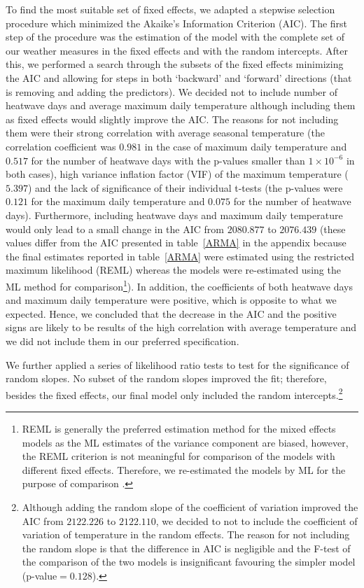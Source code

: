 \documentclass[12pt]{iopart}
\begin{document}
To find the most suitable set of fixed effects, we adapted a stepwise selection procedure which minimized the Akaike's Information Criterion (AIC). The first step of the procedure was the estimation of the model with the complete set of our weather measures in the fixed effects and with the random intercepts. After this, we performed a search through the subsets of the fixed effects minimizing the AIC and allowing for steps in both `backward' and `forward' directions (that is removing and adding the predictors). We decided not to include number of heatwave days and average maximum daily temperature although including them as fixed effects would slightly improve the AIC. The reasons for not including them were their strong correlation with average seasonal temperature (the correlation coefficient was $0.981$ in the case of maximum daily temperature and $0.517$ for the number of heatwave days with the p-values smaller than $1\times10^{-6}$ in both cases), high variance inflation factor (VIF) of the maximum temperature ($5.397$) and the lack of significance of their individual t-tests (the p-values were $0.121$ for the maximum daily temperature and $0.075$ for the number of heatwave days). Furthermore, including heatwave days and maximum daily temperature would only lead to a small change in the AIC from $2080.877$ to $2076.439$ (these values differ from the AIC presented in table~\ref{ARMA} in the appendix because the final estimates reported in table~\ref{ARMA} were estimated using the restricted maximum likelihood (REML) whereas the models were re-estimated using the ML method for comparison\footnote{REML is generally the preferred estimation method for the mixed effects models as the ML estimates of the variance component are biased, however, the REML criterion is not meaningful for comparison of the models with different fixed effects. Therefore, we re-estimated the models by ML for the purpose of comparison \cite{Zuur2009}.}). In addition, the coefficients of both heatwave days and maximum daily temperature were positive, which is opposite to what we expected. Hence, we concluded that the decrease in the AIC and the positive signs are likely to be results of the high correlation with average temperature and we did not include them in our preferred specification.

We further applied a series of likelihood ratio tests to test for the significance of random slopes. No subset of the random slopes improved the fit; therefore, besides the fixed effects, our final model only included the random intercepts.\footnote{Although adding the random slope of the coefficient of variation improved the AIC from $2122.226$ to $2122.110$, we decided to not to include the coefficient of variation of temperature in the random effects. The reason for not including the random slope is that the difference in AIC is negligible and the F-test of the comparison of the two models is insignificant favouring the simpler model (p-value$=0.128$).} 
\end{document}
